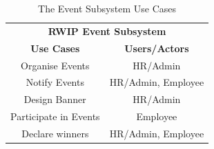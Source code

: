 \begin{table}[h!t]
\caption{The Event Subsystem Use Cases}
{%
\newcommand{\mc}[2]{\multicolumn{#1}{#2}}
\begin{center}
\begin{tabular}{|c|c|}
\hline
\multicolumn{2}{|c|}{\textbf{RWIP Event Subsystem}} \\ \cline{1-2}
\textbf{Use Cases} & \textbf{Users/Actors} \\
\hline
\rule{0pt}{24pt}  Organise Events & HR/Admin \\
\hline
\rule{0pt}{24pt}  Notify Events & HR/Admin, Employee \\
\hline
\rule{0pt}{24pt}  Design Banner & HR/Admin \\
\hline
\rule{0pt}{24pt}  Participate in Events & Employee \\
\hline
\rule{0pt}{24pt}  Declare winners & HR/Admin, Employee \\
\hline
\end{tabular}
\end{center}
}%
\label{tab:event}
\end{table}

